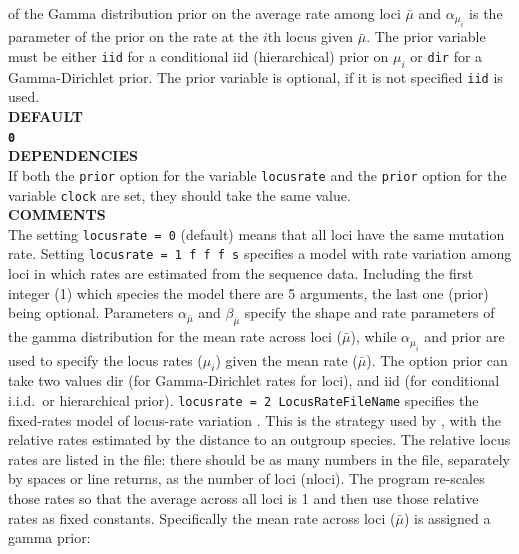 \documentclass[a4paper]{book}
\numberwithin{equation}{section} \renewcommand{\baselinestretch}{0.55}
\begin{document}
of the Gamma distribution prior on the average rate among loci
$\bar{\mu}$ and $\alpha_{\mu_i}$ is the parameter of the prior on the
rate at the $i$th locus given $\bar{\mu}$. The prior variable must be
either \texttt{iid} for a conditional iid (hierarchical) prior on
$\mu_i$ or \texttt{dir} for a Gamma-Dirichlet prior. The prior
variable is optional, if it is not specified \texttt{iid} is used.
\vspace{5pt}\\
\textbf{DEFAULT} \vspace{5pt}\\
\textbf{\texttt{0}} \vspace{5pt}\\
\textbf{DEPENDENCIES} \vspace{5pt}\\
If both the \texttt{prior} option for the variable \texttt{locusrate}
and the \texttt{prior} option
for the variable \texttt{clock} are set, they should take the same value.  \vspace{5pt} \\
\textbf{COMMENTS} \vspace{5pt}\\
The setting \texttt{locusrate = 0} (default) means that all loci have
the same mutation rate.  Setting \texttt{locusrate = 1 f f f s}
specifies a model with rate variation among loci in which rates are
estimated from the sequence data.  Including the first integer (1)
which species the model there are 5 arguments, the last one (prior)
being optional.  Parameters $\alpha_{\bar{\mu}}$ and
$\beta_{\bar{\mu}}$ specify the shape and rate parameters of the gamma
distribution for the mean rate across loci ($\bar\mu$), while
$\alpha_{\mu_i}$ and prior are used to specify the locus rates
($\mu_i$) given the mean rate ($\bar\mu$). The option prior can take
two values dir (for Gamma-Dirichlet rates for loci), and iid (for
conditional i.i.d.\ or hierarchical prior).  \texttt{locusrate = 2
  LocusRateFileName} specifies the fixed-rates model of locus-rate
variation \citep{Burgess2008}.  This is the strategy used by
\citet{Yang2002}, with the relative rates estimated by the distance to
an outgroup species.  The relative locus rates are listed in the file:
there should be as many numbers in the file, separately by spaces or
line returns, as the number of loci (nloci).  The program re-scales
those rates so that the average across all loci is 1 and then use
those relative rates as fixed constants.  Specifically the mean rate
across loci ($\bar{\mu}$) is assigned a gamma prior:
\end{document}
